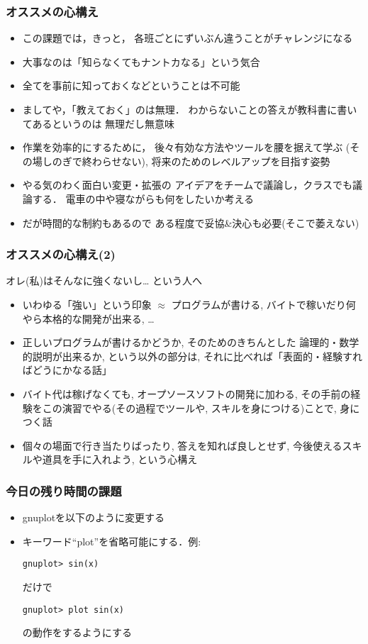 \documentclass[12pt,dvipdfmx]{beamer}
\newcommand{\mura}[1]{{\color{purple}#1}}
\begin{document}
\begin{frame}
\frametitle{オススメの心構え}
\begin{itemize}
\item<1-> この課題では，きっと，
  各班ごとにずいぶん\mura{違うことがチャレンジになる}
\item<2-> 大事なのは「知らなくてもナントカなる」という\mura{気合}
\item<3-> 全てを事前に知っておくなどということは\mura{不可能}
\item<4-> ましてや，\mura{「教えておく」のは無理}．
わからないことの答えが教科書に書いてあるというのは
無理だし無意味
\item<5-> 作業を効率的にするために，
  後々有効な方法やツールを腰を据えて学ぶ
  (その場しのぎで終わらせない), \mura{将来のためのレベルアップを目指す姿勢}
\item<6-> やる気のわく面白い変更・拡張の
  \mura{アイデアをチームで議論し，クラスでも議論}する．
  電車の中や寝ながらも\mura{何をしたいか考える}
\item<7-> だが時間的な制約もあるので
  \mura{ある程度で妥協\&決心}も必要(そこで萎えない)
\end{itemize}
\end{frame}

\begin{frame}
  \frametitle{オススメの心構え(2)}
  \mura{オレ(私)はそんなに強くないし\ldots} という人へ
  \begin{itemize}
  \item<2-> いわゆる「強い」という印象 $\approx$ プログラムが書ける,
    バイトで稼いだり何やら本格的な開発が出来る, \ldots
  \item<3-> 正しいプログラムが書けるかどうか, そのためのきちんとした
    論理的・数学的説明が出来るか, という以外の部分は,
    それに比べれば\mura{「表面的・経験すればどうにかなる話」}
  \item<4-> バイト代は稼げなくても, オープソースソフトの開発に加わる,
    その手前の経験をこの演習でやる(その過程でツールや,
    スキルを身につける)ことで, 身につく話
  \item<5-> 個々の場面で行き当たりばったり, 答えを知れば良しとせず,
    \mura{今後使えるスキルや道具を手に入れよう}, という心構え
  \end{itemize}
\end{frame}

\begin{frame}[fragile]
\frametitle{今日の残り時間の課題}
\begin{itemize}
\item gnuplotを以下のように変更する
\item キーワード``plot''を省略可能にする．例:
\begin{lstlisting}
gnuplot> sin(x)
\end{lstlisting}
だけで
\begin{lstlisting}
gnuplot> plot sin(x)
\end{lstlisting}
の動作をするようにする
\end{itemize}
\end{frame}
\end{document}

